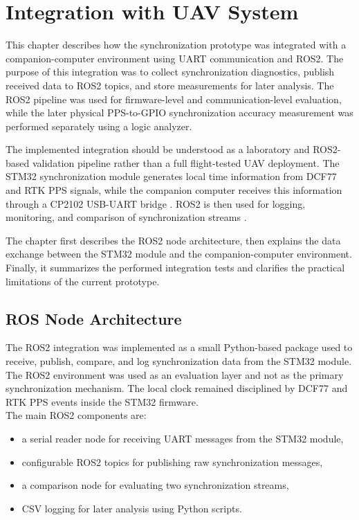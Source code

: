 
\chapter{Integration with UAV System\label{chap:integration}}

This chapter describes how the synchronization prototype was integrated with a companion-computer environment using UART communication and ROS2. 
The purpose of this integration was to collect synchronization diagnostics, publish received data to ROS2 topics, and store measurements for later analysis. The ROS2 pipeline was used for firmware-level and communication-level evaluation, while the later physical PPS-to-GPIO synchronization accuracy measurement was performed separately using a logic analyzer.

The implemented integration should be understood as a laboratory and ROS2-based validation pipeline rather than a full flight-tested UAV deployment. The STM32 synchronization module generates local time information from DCF77 and RTK PPS signals, while the companion computer receives this information through a CP2102 USB-UART bridge \cite{cp2102Datasheet}. ROS2 is then used for logging, monitoring, and comparison of synchronization streams \cite{ros2Docs}.

The chapter first describes the ROS2 node architecture, then explains the data exchange between the STM32 module and the companion-computer environment. Finally, it summarizes the performed integration tests and clarifies the practical limitations of the current prototype.

\section{ROS Node Architecture}

The ROS2 integration was implemented as a small Python-based package used to receive, publish, compare, and log synchronization data from the STM32 module. The ROS2 environment was used as an evaluation layer and not as the primary synchronization mechanism. The local clock remained disciplined by DCF77 and RTK PPS events inside the STM32 firmware.
\\
The main ROS2 components are:
\begin{itemize}
    \item a serial reader node for receiving UART messages from the STM32 module,
    \item configurable ROS2 topics for publishing raw synchronization messages,
    \item a comparison node for evaluating two synchronization streams,
    \item CSV logging for later analysis using Python scripts.
\end{itemize}

